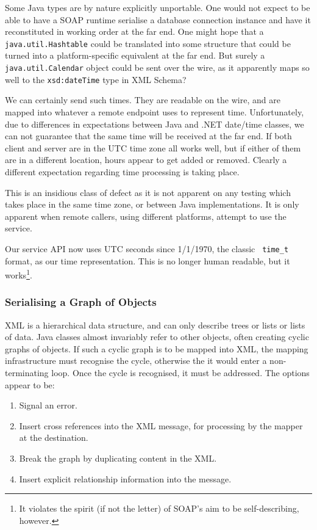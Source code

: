Some Java types are by nature explicitly unportable. One would not
expect to be able to have a SOAP runtime serialise a database
connection instance and have it reconstituted in working order at the
far end. One might hope that a {\tt java.util.Hashtable} could be
translated into some structure that could be turned into a
platform-specific equivalent at the far end. But surely a {\tt
java.util.Calendar} object could be sent over the wire, as it
apparently maps so well to the {\tt xsd:dateTime} type in XML Schema?

We can certainly send such times. They are readable on the wire, and
are mapped into whatever a remote endpoint uses to represent
time. Unfortunately, due to differences in expectations between Java
and .NET date/time classes, we can not guarantee that the same time
will be received at the far end. If both client and server are in the
UTC time zone all works well, but if either of them are in a different
location, hours appear to get added or removed. Clearly a different
expectation regarding time processing is taking place.

This is an insidious class of defect as it is not apparent on any
testing which takes place in the same time zone, or between Java
implementations. It is only apparent when remote callers, using
different platforms, attempt to use the service.

Our service API now uses UTC seconds since 1/1/1970, the classic {\tt
time\_t} format, as our time representation. This is no longer human
readable, but it works\footnote{It violates the spirit (if not the
letter) of SOAP's aim to be self-describing, however.}.

\subsubsection{Serialising a Graph of Objects}
\label{objections:o-x:graphs}

XML is a hierarchical data structure, and can only describe trees or
lists or lists of data. Java classes almost invariably refer to other
objects, often creating cyclic graphs of objects. If such a cyclic
graph is to be mapped into XML, the mapping infrastructure must
recognise the cycle, otherwise the it would enter a non-terminating
loop. Once the cycle is recognised, it must be addressed. The options
appear to be:
\begin{enumerate}
\item Signal an error.
\item Insert cross references into the XML message, for processing by
the mapper at the destination. 
\item Break the graph by duplicating content in the XML.
\item Insert explicit relationship information into the message.
\end{enumerate}

